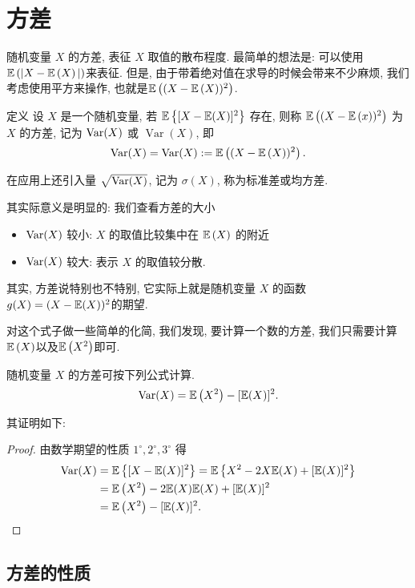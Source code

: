 \section{方差}
随机变量 $X$ 的方差, 表征 $X$ 取值的散布程度. 最简单的想法是: 可以使用$\mathbb E\left(|X-\mathbb E\left(X\right)|\right)$来表征. 但是, 由于带着绝对值在求导的时候会带来不少麻烦, 我们考虑使用平方来操作, 也就是$\mathbb E\left((X-\mathbb E\left(X\right))^2\right)$. 

\begin{definition}
    定义 设 $X$ 是一个随机变量, 若 $\mathbb E\left\{[X-\mathbb E(X)]^2\right\}$ 存在, 则称 $\mathbb E\left((X-\mathbb E\left(x\right))^2\right)$ 为 $X$ 的方差, 记为 $\operatorname{Var}(X)$ 或 $\operatorname{Var}(X)$, 即
$$
\operatorname{Var}(X)=\operatorname{Var}(X):=\mathbb E\left((X-\mathbb E\left(X\right))^2\right).
$$
\end{definition}

在应用上还引入量 $\sqrt{\operatorname{Var}(X)}$, 记为 $\sigma(X)$, 称为标准差或均方差.

其实际意义是明显的: 我们查看方差的大小
\begin{itemize}
    \item $\operatorname{Var} (X)$ 较小:  $X$ 的取值比较集中在 $\mathbb E\left(X\right) $ 的附近
    \item $\operatorname{Var}(X)$ 较大: 表示 $X$ 的取值较分散.
\end{itemize}

其实, 方差说特别也不特别, 它实际上就是随机变量 $X$ 的函数 $g(X)=(X-\mathbb E(X))^2$的期望. 

对这个式子做一些简单的化简, 我们发现, 要计算一个数的方差, 我们只需要计算$\mathbb E\left(X\right)$以及$\mathbb E\left(X^2\right)$即可. 

   \begin{proposition}
       随机变量 $X$ 的方差可按下列公式计算.
   $$
   \operatorname{Var}(X)=\mathbb E\left(X^2\right)-[\mathbb E(X)]^2 .
   $$
   \end{proposition}
   
   其证明如下: 
   \begin{proof}
       由数学期望的性质 $1^{\circ}, 2^{\circ}, 3^{\circ}$ 得
   $$
   \begin{aligned}
   \operatorname{Var}(X) & =\mathbb E\left\{[X-\mathbb E(X)]^2\right\}=\mathbb E\left\{X^2-2 X \mathbb E(X)+[\mathbb E(X)]^2\right\} \\
   & =\mathbb E\left( X^2\right)-2 \mathbb E(X) \mathbb E(X)+[\mathbb E(X)]^2 \\
   & =\mathbb E\left(X^2\right)-[\mathbb E(X)]^2 .
   \end{aligned}
   $$
      \end{proof}




   \subsection{方差的性质}

